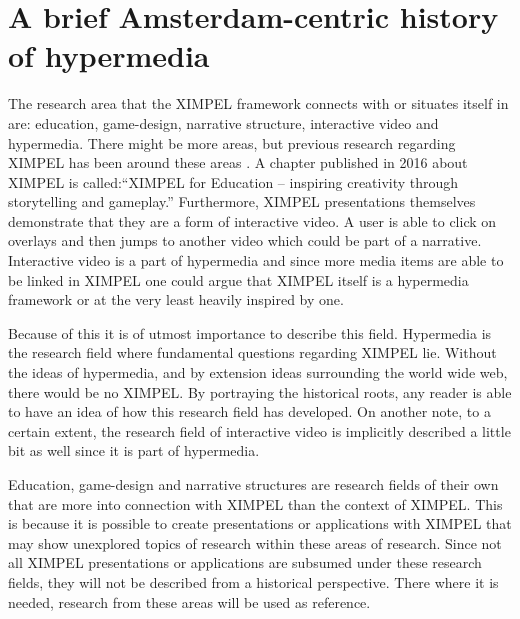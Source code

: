 
\chapter{A brief Amsterdam-centric history of hypermedia}
The research area that the XIMPEL framework connects with or situates itself in are: education, game-design, narrative structure, interactive video and hypermedia. There might be more areas, but previous research regarding XIMPEL has been around these areas \cite{eliens2008, eliens2016, eliens2007, stefan2016}. A chapter published in 2016 about XIMPEL is called:``XIMPEL for Education -- inspiring creativity through storytelling and gameplay.'' Furthermore, XIMPEL presentations themselves demonstrate that they are a form of interactive video. A user is able to click on overlays and then jumps to another video which could be part of a narrative. Interactive video is a part of hypermedia and since more media items are able to be linked in XIMPEL one could argue that XIMPEL itself is a hypermedia framework or at the very least heavily inspired by one.

Because of this it is of utmost importance to describe this field. Hypermedia is the research field where fundamental questions regarding XIMPEL lie. Without the ideas of hypermedia, and by extension ideas surrounding the world wide web, there would be no XIMPEL. By portraying the historical roots, any reader is able to have an idea of how this research field has developed. On another note, to a certain extent, the research field of interactive video is implicitly described a little bit as well since it is part of hypermedia.

Education, game-design and narrative structures are research fields of their own that are more into connection with XIMPEL than the context of XIMPEL. This is because it is possible to create presentations or applications with XIMPEL that may show unexplored topics of research within these areas of research. Since not all XIMPEL presentations or applications are subsumed under these research fields, they will not be described from a historical perspective. There where it is needed, research from these areas will be used as reference.

